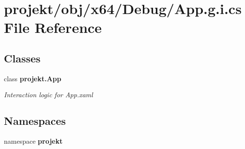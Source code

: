\section{projekt/obj/x64/\+Debug/\+App.g.\+i.\+cs File Reference}
\label{x64_2Debug_2App_8g_8i_8cs}
\subsection*{Classes}
\begin{DoxyCompactItemize}
\item 
class \textbf{ projekt.\+App}
\begin{DoxyCompactList}\small\item\em Interaction logic for App.\+xaml \end{DoxyCompactList}\end{DoxyCompactItemize}
\subsection*{Namespaces}
\begin{DoxyCompactItemize}
\item 
namespace \textbf{ projekt}
\end{DoxyCompactItemize}

